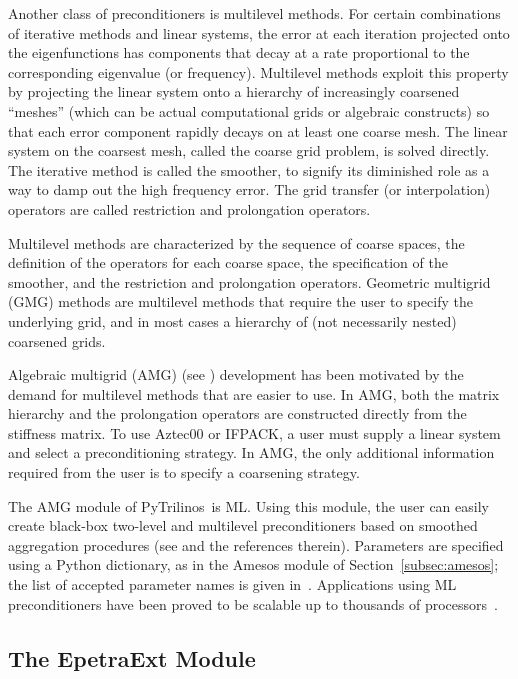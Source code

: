 \documentclass[acmtocl]{acmtrans2m}
\newcommand{\PyTrilinos}{{PyTrilinos}}
\begin{document}
Another class of preconditioners is multilevel methods. For certain
combinations of iterative methods and linear systems, the error at
each iteration projected onto the eigenfunctions has components that
decay at a rate proportional to the corresponding eigenvalue (or
frequency).  Multilevel methods exploit this property \cite{Briggs}
by projecting the linear system onto a hierarchy of increasingly
coarsened ``meshes'' (which can be actual computational grids or
algebraic constructs) so that each error component rapidly decays on
at least one coarse mesh.  The linear system on the coarsest mesh,
called the coarse grid problem, is solved directly. The iterative
method is called the smoother, to signify its diminished role as a
way to damp out the high frequency error.  The grid transfer (or
interpolation) operators are called restriction and prolongation
operators.

Multilevel methods are characterized by the sequence of coarse spaces,
the definition of the operators for each coarse space, the
specification of the smoother, and the restriction and prolongation
operators.  Geometric multigrid (GMG) methods are multilevel methods
that require the user to specify the underlying grid, and in most
cases a hierarchy of (not necessarily nested) coarsened grids.

Algebraic multigrid (AMG) (see \cite[Section 8]{Briggs}) development
has been motivated by the demand for multilevel methods that are
easier to use.  In AMG, both the matrix hierarchy and the prolongation
operators are constructed directly from the stiffness matrix.  To use
Aztec00 or IFPACK, a user must supply a linear system and select a
preconditioning strategy.  In AMG, the only additional information
required from the user is to specify a coarsening strategy.

The AMG module of \PyTrilinos\ is ML.  Using this module, the user can
easily create black-box two-level and multilevel preconditioners based
on smoothed aggregation procedures (see
\cite{sala04analysis,brezina97robust} and the references therein).
Parameters are specified using a Python dictionary, as in the Amesos
module of Section~\ref{subsec:amesos}; the list of accepted parameter
names is given in~\cite{ml-guide}.  Applications using ML
preconditioners have been proved to be scalable up to thousands of
processors~\cite{ijnme,shadid-jcp-dd-precond}.

\subsection{The EpetraExt Module}
\label{subsec:epetraext}
\end{document}
